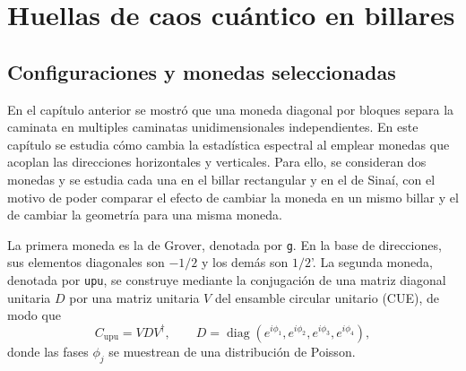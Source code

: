 \documentclass[12pt,a4paper,oneside]{report} %
\begin{document}
\chapter{Huellas de caos cuántico en billares} %
\section{Configuraciones y monedas seleccionadas} %

En el capítulo anterior se mostró que una moneda diagonal por bloques separa la caminata en multiples caminatas unidimensionales independientes. En este capítulo se estudia cómo cambia la estadística espectral al emplear monedas que acoplan las direcciones horizontales y verticales. Para ello, se consideran dos monedas y se estudia cada una en el billar rectangular y en el de Sinaí, con el motivo de poder comparar el efecto de cambiar la moneda en un mismo billar y el de cambiar la geometría para una misma moneda.

La primera moneda es la de Grover, denotada por \texttt{g}. En la base de direcciones, sus elementos diagonales son $-1/2$ y los demás son $1/2$'. La segunda moneda, denotada por \texttt{upu}, se construye mediante la conjugación de una matriz diagonal unitaria $D$ por una matriz unitaria $V$ del ensamble circular unitario (CUE), de modo que
\begin{equation}
  C_{\mathrm{upu}} = V D V^\dagger,
  \qquad
  D = \operatorname{diag}\!\left(
    e^{i\phi_1}, e^{i\phi_2}, e^{i\phi_3}, e^{i\phi_4}
  \right),
\end{equation}
donde las fases $\phi_j$ se muestrean de una distribución de Poisson. 
\end{document}
